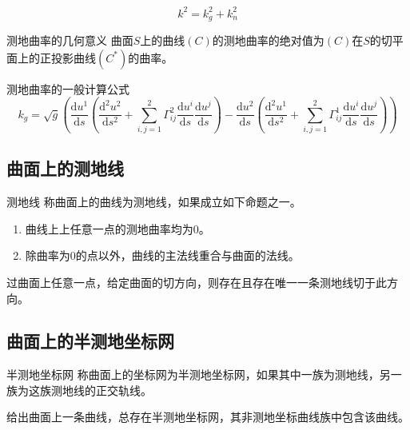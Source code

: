 \documentclass[lang = cn, scheme = chinese, thmcnt = section]{elegantbook}
\newcommand{\dd}{\mathrm{d}}           %
\begin{document}
\begin{proposition}
	$$
	k^2=k_g^2+k_n^2
	$$
\end{proposition}

\begin{proposition}{测地曲率的几何意义}
	曲面$S$上的曲线$(C)$的测地曲率的绝对值为$(C)$在$S$的切平面上的正投影曲线$(C^*)$的曲率。
\end{proposition}

\begin{proposition}{测地曲率的一般计算公式}
	$$
	k_g=\sqrt{g}
	\left(
		\frac{\dd u^1}{\dd s}
			\left(
				\frac{\dd ^2 u^2}{\dd s^2}+\sum_{i,j=1}^{2}\Gamma_{ij}^2\frac{\dd u^i}{\dd s}\frac{\dd u^j}{\dd s}
			\right)
			-\frac{\dd u^2}{\dd s}
			\left(
				\frac{\dd ^2 u^1}{\dd s^2}+\sum_{i,j=1}^{2}\Gamma_{ij}^1\frac{\dd u^i}{\dd s}\frac{\dd u^j}{\dd s}
			\right)
	\right)
	$$
\end{proposition}

\subsection{曲面上的测地线}

\begin{definition}{测地线}
	称曲面上的曲线为测地线，如果成立如下命题之一。
	\begin{enumerate}
		\item 曲线上上任意一点的测地曲率均为$0$。
		\item 除曲率为$0$的点以外，曲线的主法线重合与曲面的法线。
	\end{enumerate}
\end{definition}

\begin{theorem}
	过曲面上任意一点，给定曲面的切方向，则存在且存在唯一一条测地线切于此方向。
\end{theorem}

\subsection{曲面上的半测地坐标网}

\begin{definition}{半测地坐标网}
	称曲面上的坐标网为半测地坐标网，如果其中一族为测地线，另一族为这族测地线的正交轨线。
\end{definition}

\begin{proposition}
	给出曲面上一条曲线，总存在半测地坐标网，其非测地坐标曲线族中包含该曲线。
\end{proposition}
\end{document}
